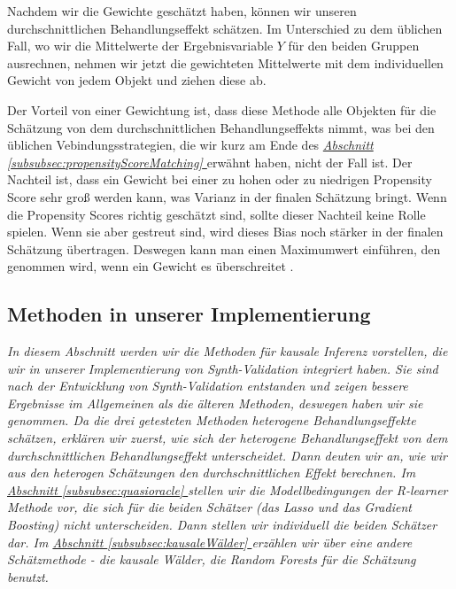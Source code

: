 \documentclass[12pt,a4paper,twoside]{scrartcl}
\numberwithin{equation}{section}
\newcommand{\refsec}[1]{\emph{\hyperref[#1]{Abschnitt \ref*{#1} }}}
\begin{document}
\noindent
Nachdem wir die Gewichte geschätzt haben, können wir unseren durchschnittlichen Behandlungseffekt schätzen. Im Unterschied zu dem üblichen Fall, wo wir die Mittelwerte der Ergebnisvariable $Y$ für den beiden Gruppen ausrechnen, nehmen wir jetzt die gewichteten Mittelwerte mit dem individuellen Gewicht von jedem Objekt und ziehen diese ab.\par

\noindent
Der Vorteil von einer Gewichtung ist, dass diese Methode alle Objekten für die Schätzung von dem durchschnittlichen Behandlungseffekts nimmt, was bei den üblichen Vebindungsstrategien, die wir kurz am Ende des \refsec{subsubsec:propensityScoreMatching} erwähnt haben, nicht der Fall ist. Der Nachteil ist, dass ein Gewicht bei einer zu hohen oder zu niedrigen Propensity Score sehr groß werden kann, was Varianz in der finalen Schätzung bringt. Wenn die Propensity Scores richtig geschätzt sind, sollte dieser Nachteil keine Rolle spielen. Wenn sie aber gestreut sind, wird dieses Bias noch stärker in der finalen Schätzung übertragen. Deswegen kann man einen Maximumwert einführen, den genommen wird, wenn ein Gewicht es überschreitet \cite{stuart2010matching}.  
\par

\subsection{Methoden in unserer Implementierung}\label{subsec:methodenInImplementierung}
\noindent
\emph{In diesem Abschnitt werden wir die Methoden für kausale Inferenz vorstellen, die wir in unserer Implementierung von Synth-Validation integriert haben. Sie sind nach der Entwicklung von Synth-Validation entstanden und zeigen bessere Ergebnisse im Allgemeinen als die älteren Methoden, deswegen haben wir sie genommen. Da die drei getesteten Methoden heterogene Behandlungseffekte schätzen, erklären wir zuerst, wie sich der heterogene Behandlungseffekt von dem durchschnittlichen Behandlungseffekt unterscheidet. Dann deuten wir an, wie wir aus den heterogen Schätzungen den durchschnittlichen Effekt berechnen. Im \refsec{subsubsec:quasioracle} stellen wir die Modellbedingungen der R-learner Methode vor, die sich für die beiden Schätzer (das Lasso und das Gradient Boosting) nicht unterscheiden. Dann stellen wir individuell die beiden Schätzer dar. Im \refsec{subsubsec:kausaleWälder} erzählen wir über eine andere Schätzmethode - die kausale Wälder, die Random Forests für die Schätzung benutzt.}\par
\end{document}
